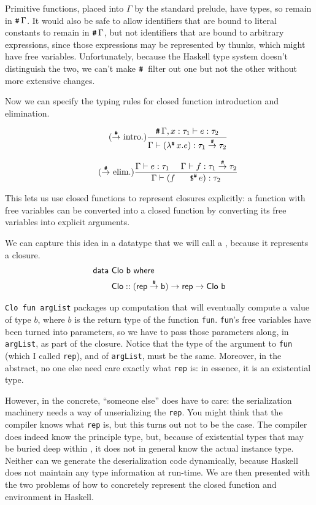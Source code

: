 \documentclass[preprint]{sigplanconf}
\begin{document}
Primitive functions, placed into $\Gamma$ by the standard prelude, have \nfn{} types, so remain in $\texttt{\#}\,\Gamma$.
It would also be safe to allow identifiers that are bound to literal constants to remain in $\texttt{\#}\,\Gamma$, but not  identifiers that are bound to
arbitrary expressions, since those expressions may be represented by thunks, which might have free variables.  Unfortunately, because the Haskell type system doesn't distinguish the two, we can't make $\closed$ filter out one but not the other without more extensive changes.

Now we can specify the typing rules for closed function introduction and elimination. 

\begin{equation*}
\tag{\nfn~intro.}
\frac{\closed{\Gamma}, x : \tau_1 \entails e : \tau_2}
		{\Gamma \entails (\nlambda x.e) : \tau_1 \nfn \tau_2}
\end{equation*}


\begin{equation*}
\tag{\nfn~elim.}
\frac{\Gamma \entails e : \tau_1 ~~~~ \Gamma \entails f : \tau_1  \nfn \tau_2}
		{\Gamma \entails (f \napp e) : \tau_2}
\end{equation*}


This lets us use closed functions to represent closures explicitly: a function with free variables can be converted into a closed function by converting its free variables into explicit arguments.

We can capture this idea in a datatype that we will call a , because it represents a closure.
\begin{align*}
\textsf{data}~&\textsf{Clo}~\textsf{b}~\textsf{where}\\
				 	&\sf Clo :: \sf (rep \stackrel{\texttt{\#}}{\rightarrow} b) \rightarrow rep \rightarrow Clo~b
\end{align*}

\texttt{Clo fun argList} packages up computation that will eventually compute a value of type $b$, where $b$ is the return type of the function \texttt{fun}.  
\texttt{fun}'s free variables have been turned into parameters, so we have to pass those parameters along, in \texttt{argList}, as part of the closure.  
Notice that the type of the argument to \texttt{fun} (which I called \texttt{rep}), and of \texttt{argList}, must be the same.
Moreover, in the abstract, no one else need care exactly what \texttt{rep} is: in essence, it is an existential type.

However, in the concrete, ``someone else'' does have to care: the serialization machinery needs a way of unserializing the \texttt{rep}.  
You might think that the compiler knows what \texttt{rep} is, but this turns out not to be the case. 
The compiler does indeed know the principle type, but, because of existential types that may be buried deep within , it does not in general know the 
actual instance type. Neither can we generate the deserialization code dynamically, because Haskell does not maintain any type information at run-time. We are then presented with the two problems of how to concretely represent the closed function and environment in Haskell.
\end{document}
